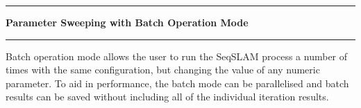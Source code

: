 \noindent\rule{\textwidth}{1pt}
\indent \textbf{Parameter Sweeping with Batch Operation Mode}
\noindent\rule{\textwidth}{1pt}
\smallskip
\parbox{\textwidth}{Batch operation mode allows the user to run the SeqSLAM process a number of times with the same configuration, but changing the value of any numeric parameter. To aid in performance, the batch mode can be parallelised and batch results can be saved without including all of the individual iteration results. }
